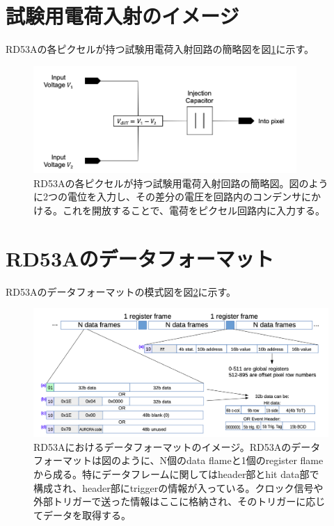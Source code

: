 \section{試験用電荷入射のイメージ}
RD53Aの各ピクセルが持つ試験用電荷入射回路の簡略図を図\ref{injection_circuit}に示す。
\begin{figure}[bpt]\centering
\includegraphics[width=10cm]{./injection_circuit.png}
\caption[RD53Aの各ピクセルが持つ試験用電荷入射回路の簡略図]{RD53Aの各ピクセルが持つ試験用電荷入射回路の簡略図\cite{b-1}。図のように2つの電位を入力し、その差分の電圧を回路内のコンデンサにかける。これを開放することで、電荷をピクセル回路内に入力する。}
\label{injection_circuit}
\end{figure}

\section{RD53Aのデータフォーマット}
RD53Aのデータフォーマットの模式図を図\ref{RD53A_data_format}に示す。
\begin{figure}[bpt]\centering
\includegraphics[width=14cm]{./RD53A_data_format.png}
\caption[RD53Aにおけるデータフォーマットのイメージ図]{RD53Aにおけるデータフォーマットのイメージ\cite{2-1}。RD53Aのデータフォーマットは図のように、N個のdata flameと1個のregister flameから成る。特にデータフレームに関してはheader部とhit data部で構成され、header部にtriggerの情報が入っている。クロック信号や外部トリガーで送った情報はここに格納され、そのトリガーに応じてデータを取得する。}
\label{RD53A_data_format}
\end{figure}

